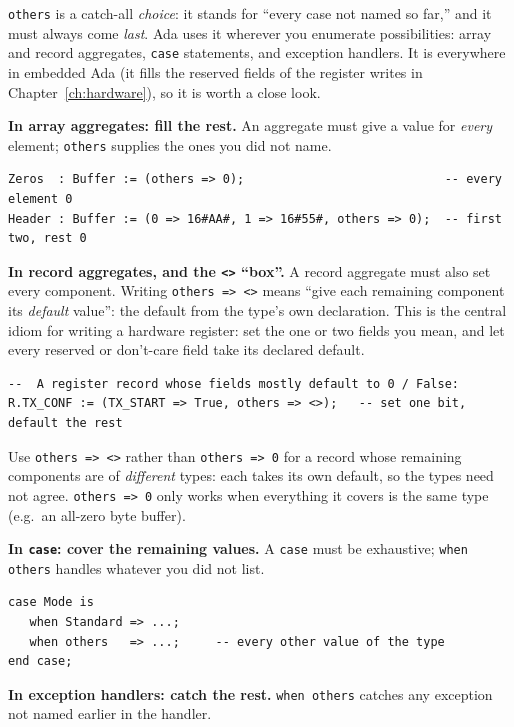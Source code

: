 \texttt{others} is a catch-all \emph{choice}: it stands for ``every case not
named so far,'' and it must always come \emph{last}. Ada uses it wherever you
enumerate possibilities: array and record aggregates, \texttt{case} statements,
and exception handlers. It is everywhere in embedded Ada (it fills the reserved
fields of the register writes in Chapter~\ref{ch:hardware}), so it is worth a
close look.

\textbf{In array aggregates: fill the rest.} An aggregate must give a value for
\emph{every} element; \texttt{others} supplies the ones you did not name.

\begin{lstlisting}
Zeros  : Buffer := (others => 0);                            -- every element 0
Header : Buffer := (0 => 16#AA#, 1 => 16#55#, others => 0);  -- first two, rest 0
\end{lstlisting}

\textbf{In record aggregates, and the \texttt{<>} ``box''.} A record aggregate
must also set every component. Writing \texttt{others => <>} means ``give each
remaining component its \emph{default} value'': the default from the type's
own declaration. This is the central idiom for writing a hardware register: set
the one or two fields you mean, and let every reserved or don't-care field take
its declared default.

\begin{lstlisting}
--  A register record whose fields mostly default to 0 / False:
R.TX_CONF := (TX_START => True, others => <>);   -- set one bit, default the rest
\end{lstlisting}

Use \texttt{others => <>} rather than \texttt{others => 0} for a record whose
remaining components are of \emph{different} types: each takes its own default, so
the types need not agree. \texttt{others => 0} only works when everything it
covers is the same type (e.g.\ an all-zero byte buffer).

\textbf{In \texttt{case}: cover the remaining values.} A \texttt{case} must be
exhaustive; \texttt{when others} handles whatever you did not list.

\begin{lstlisting}
case Mode is
   when Standard => ...;
   when others   => ...;     -- every other value of the type
end case;
\end{lstlisting}

\textbf{In exception handlers: catch the rest.} \texttt{when others} catches
any exception not named earlier in the handler.

